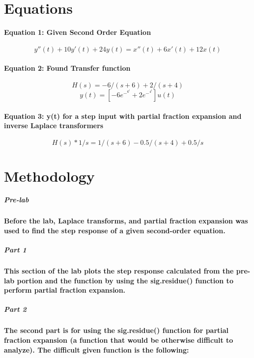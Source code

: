 \documentclass[12pt,a4paper]{article}
\begin{document}
\section{Equations}\label{sec:lit-rev}
\paragraph{Equation 1: Given Second Order Equation}

$$y''(t) + 10y'(t) + 24y(t) = x''(t) + 6x'(t) + 12x(t)$$

\paragraph{Equation 2: Found Transfer function }
$$H(s) = -6/(s+6) + 2/(s+4)$$
$$y(t) = [-6e^-^6^t + 2e^-^4^t]u(t) $$

\paragraph{Equation 3: y(t) for a step input with partial fraction expansion and inverse Laplace transformers}

$$H(s)* 1/s = 1/(s+6)- 0.5/(s+4)+0.5/s$$



\section{Methodology}\label{sec:meth}

\subparagraph{\Large Pre-lab}

\paragraph{Before the lab, Laplace transforms, and partial fraction expansion was used to find the step response of a given second-order equation. }
\newpage



\subparagraph{\Large Part 1}

\paragraph{This section of the lab plots the step response calculated from the pre-lab portion and the function by using the sig.residue() function to perform partial fraction expansion.}

\subparagraph{\Large Part 2}

\paragraph{The second part is for using the sig.residue() function for partial fraction expansion (a function that would be otherwise difficult to analyze). The difficult given function is the following:}
\end{document}
